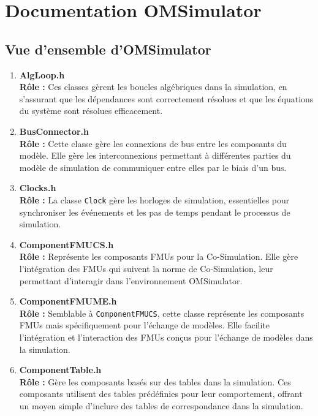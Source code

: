 \chapter{Documentation OMSimulator}
\label{app:documentation}


\section{Vue d'ensemble d'OMSimulator}

\begin{enumerate}
    \item \textbf{AlgLoop.h} \\
    \textbf{Rôle :} Ces classes gèrent les boucles algébriques dans la simulation, en s'assurant que les dépendances sont correctement résolues et que les équations du système sont résolues efficacement.

    \item \textbf{BusConnector.h} \\
    \textbf{Rôle :} Cette classe gère les connexions de bus entre les composants du modèle. Elle gère les interconnexions permettant à différentes parties du modèle de simulation de communiquer entre elles par le biais d'un bus.

    \item \textbf{Clocks.h} \\
    \textbf{Rôle :} La classe \texttt{Clock} gère les horloges de simulation, essentielles pour synchroniser les événements et les pas de temps pendant le processus de simulation.

    \item \textbf{ComponentFMUCS.h} \\
    \textbf{Rôle :} Représente les composants FMUs pour la Co-Simulation. Elle gère l'intégration des FMUs qui suivent la norme de Co-Simulation, leur permettant d'interagir dans l'environnement OMSimulator.

    \item \textbf{ComponentFMUME.h} \\
    \textbf{Rôle :} Semblable à \texttt{ComponentFMUCS}, cette classe représente les composants FMUs mais spécifiquement pour l'échange de modèles. Elle facilite l'intégration et l'interaction des FMUs conçus pour l'échange de modèles dans la simulation.

    \item \textbf{ComponentTable.h} \\
    \textbf{Rôle :} Gère les composants basés sur des tables dans la simulation. Ces composants utilisent des tables prédéfinies pour leur comportement, offrant un moyen simple d'inclure des tables de correspondance dans la simulation.


\end{enumerate}
